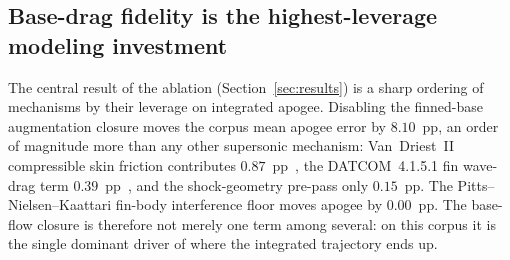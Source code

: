 
\subsection{Base-drag fidelity is the highest-leverage modeling investment}
\label{sec:disc-budget}

The central result of the ablation (Section~\ref{sec:results}) is a sharp
ordering of mechanisms by their leverage on integrated apogee. Disabling the
finned-base augmentation closure moves the corpus mean apogee error by $8.10$~pp,
an order of magnitude more than any other supersonic mechanism: Van~Driest~II
compressible skin friction contributes $0.87$~pp~\cite{hopkins1971}, the
DATCOM~4.1.5.1 fin wave-drag term $0.39$~pp~\cite{datcom1978,ulmann1956}, and the
shock-geometry pre-pass only $0.15$~pp. The Pitts--Nielsen--Kaattari fin-body
interference floor moves apogee by $0.00$~pp. The base-flow closure is therefore
not merely one term among several: on this corpus it is the single dominant
driver of where the integrated trajectory ends up.

